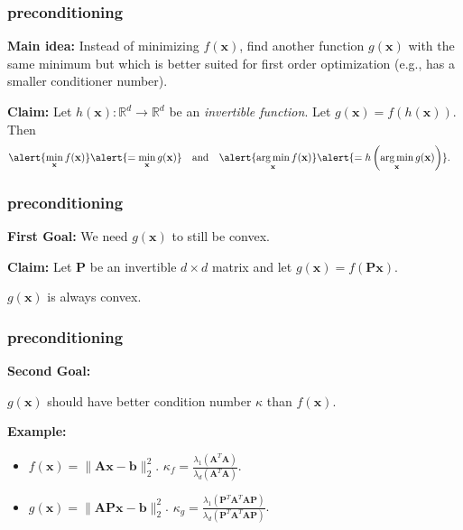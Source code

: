 \documentclass[compress]{beamer}
\newcommand{\bv}[1]{\mathbf{#1}}
\newcommand{\R}{\mathbb{R}}
\DeclareMathOperator*{\argmin}{arg\,min}
\begin{document}
\begin{frame}
	\frametitle{preconditioning}
	\textbf{Main idea:}
	Instead of minimizing $f(\bv{x})$, find another function $g(\bv{x})$ with the same minimum but which is better suited for first order optimization (e.g., has a smaller conditioner number).
	
	\vspace{2em}
	\textbf{Claim:} Let $h(\bv{x}): \R^d \rightarrow \R^d$ be an \emph{invertible function}. Let $g(\bv{x}) = f(h(\bv{x}))$. Then
	\begin{align*}
		\alert{\min_{\bv{x}} f(\bv{x})} &\alert{= \min_{\bv{x}} g(\bv{x})} & &\text{and} & \alert{\argmin_{\bv{x}} f(\bv{x})} &\alert{= h\left(\argmin_{\bv{x}} g(\bv{x})\right)}.
	\end{align*}
\end{frame}

\begin{frame}[t]
	\frametitle{preconditioning}
	\textbf{First Goal:} We need $g(\bv{x})$ to still be convex.
	
	\textbf{Claim:} Let $\bv{P}$ be an invertible $d\times d$ matrix and let $g(\bv{x}) = f(\bv{P}\bv{x})$. 
	\begin{center} 
		\alert{$g(\bv{x})$ is always convex.}
	\end{center}
\end{frame}

\begin{frame}[t]
	\frametitle{preconditioning}
	\textbf{Second Goal:} 
	
	$g(\bv{x})$ should have better condition number $\kappa$ than $f(\bv{x})$. 
	
	\textbf{Example:} 
	\begin{itemize}
		\item $f(\bv{x}) = \|\bv{A}\bv{x} - \bv{b}\|_2^2$. $\kappa_f =\frac{\lambda_1(\bv{A}^T\bv{A})}{\lambda_d(\bv{A}^T\bv{A})}$.
		\item $g(\bv{x}) = \|\bv{A}\bv{P}\bv{x} - \bv{b}\|_2^2$. $\kappa_g =\frac{\lambda_1(\bv{P}^T\bv{A}^T\bv{A}\bv{P})}{\lambda_d(\bv{P}^T\bv{A}^T\bv{A}\bv{P})}$.
	\end{itemize}
	
%	
\end{frame}
\end{document}
